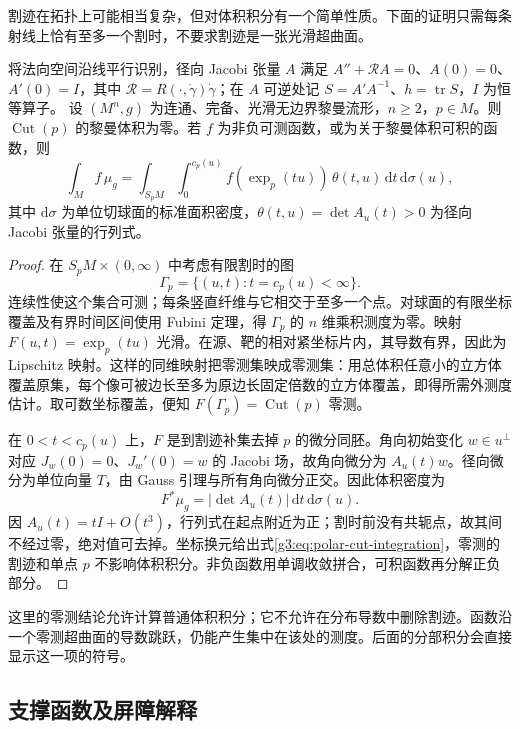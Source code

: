 割迹在拓扑上可能相当复杂，但对体积积分有一个简单性质。下面的证明只需每条射线上恰有至多一个割时，不要求割迹是一张光滑超曲面。

\begin{proposition}\label{g3:prop:cut-locus-zero-volume}
	将法向空间沿线平行识别，径向 Jacobi 张量 \(A\) 满足 \(A''+\mathcal RA=0\)、\(A(0)=0\)、\(A'(0)=I\)，其中 \(\mathcal R=R(\cdot,\dot\gamma)\dot\gamma\)；在 \(A\) 可逆处记 \(S=A'A^{-1}\)、\(h=\operatorname{tr}S\)，\(I\) 为恒等算子。
	设 \((M^n,g)\) 为连通、完备、光滑无边界黎曼流形，\(n\ge2\)，\(p\in M\)。则 \(\operatorname{Cut}(p)\) 的黎曼体积为零。若 \(f\) 为非负可测函数，或为关于黎曼体积可积的函数，则
	\begin{equation}\label{g3:eq:polar-cut-integration}
		\int_M f\,\mu_g
		=\int_{S_pM}\int_0^{c_p(u)}
		f(\exp_p(tu))\,\theta(t,u)\,\mathrm{d}t\,\mathrm{d}\sigma(u),
	\end{equation}
	其中 \(\mathrm{d}\sigma\) 为单位切球面的标准面积密度，\(\theta(t,u)=\det A_u(t)>0\) 为径向 Jacobi 张量的行列式。
\end{proposition}
\begin{proof}
	在 \(S_pM\times(0,\infty)\) 中考虑有限割时的图
	\[
		\Gamma_p=\{(u,t):t=c_p(u)<\infty\}.
	\]
	连续性使这个集合可测；每条竖直纤维与它相交于至多一个点。对球面的有限坐标覆盖及有界时间区间使用 Fubini 定理，得 \(\Gamma_p\) 的 \(n\) 维乘积测度为零。映射 \(F(u,t)=\exp_p(tu)\) 光滑。在源、靶的相对紧坐标片内，其导数有界，因此为 Lipschitz 映射。这样的同维映射把零测集映成零测集：用总体积任意小的立方体覆盖原集，每个像可被边长至多为原边长固定倍数的立方体覆盖，即得所需外测度估计。取可数坐标覆盖，便知 \(F(\Gamma_p)=\operatorname{Cut}(p)\) 零测。

	在 \(0<t<c_p(u)\) 上，\(F\) 是到割迹补集去掉 \(p\) 的微分同胚。角向初始变化 \(w\in u^\perp\) 对应 \(J_w(0)=0\)、\(J_w'(0)=w\) 的 Jacobi 场，故角向微分为 \(A_u(t)w\)。径向微分为单位向量 \(T\)，由 Gauss 引理与所有角向微分正交。因此体积密度为
	\[
		F^*\mu_g=|\det A_u(t)|\,\mathrm{d}t\,\mathrm{d}\sigma(u).
	\]
	因 \(A_u(t)=tI+O(t^3)\)，行列式在起点附近为正；割时前没有共轭点，故其间不经过零，绝对值可去掉。坐标换元给出式\eqref{g3:eq:polar-cut-integration}，零测的割迹和单点 \(p\) 不影响体积积分。非负函数用单调收敛拼合，可积函数再分解正负部分。
\end{proof}

这里的零测结论允许计算普通体积积分；它不允许在分布导数中删除割迹。函数沿一个零测超曲面的导数跳跃，仍能产生集中在该处的测度。后面的分部积分会直接显示这一项的符号。

\subsection{支撑函数及屏障解释}
\label{g3:subsec:0704:02}

